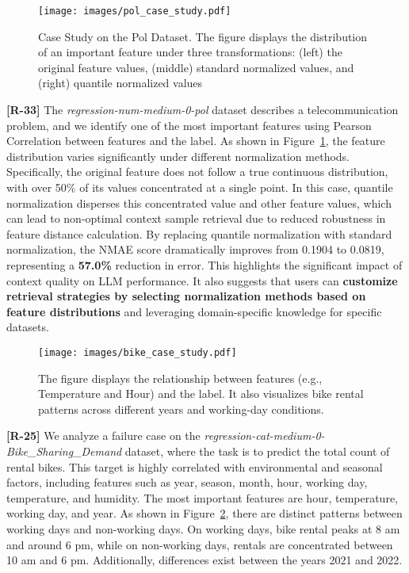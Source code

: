 \begin{figure}
    \centering
    \texttt{[image: images/pol\_case\_study.pdf]}
    \caption{Case Study on the Pol Dataset. The figure displays the distribution of an important feature under three transformations: (left) the original feature values, (middle) standard normalized values, and (right) quantile normalized values}
    \label{fig:case_pol}
\end{figure}

\textbf{[R-33]} The \textit{regression-num-medium-0-pol} dataset describes a telecommunication problem, and we identify one of the most important features using Pearson Correlation between features and the label. As shown in Figure~\ref{fig:case_pol}, the feature distribution varies significantly under different normalization methods. Specifically, the original feature does not follow a true continuous distribution, with over 50\% of its values concentrated at a single point. In this case, quantile normalization disperses this concentrated value and other feature values, which can lead to non-optimal context sample retrieval due to reduced robustness in feature distance calculation. By replacing quantile normalization with standard normalization, the NMAE score dramatically improves from 0.1904 to 0.0819, representing a \textbf{57.0\%} reduction in error. This highlights the significant impact of context quality on LLM performance. It also suggests that users can \textbf{customize retrieval strategies by selecting normalization methods based on feature distributions} and leveraging domain-specific knowledge for specific datasets.

\begin{figure}
    \centering
    \texttt{[image: images/bike\_case\_study.pdf]}
    \caption{The figure displays the relationship between features (e.g., Temperature and Hour) and the label. It also visualizes bike rental patterns across different years and working-day conditions.}
    \label{fig:case_bike}
\end{figure}


\textbf{[R-25]} We analyze a failure case on the \textit{regression-cat-medium-0-Bike\_Sharing\_Demand} dataset, where the task is to predict the total count of rental bikes. This target is highly correlated with environmental and seasonal factors, including features such as year, season, month, hour, working day, temperature, and humidity. The most important features are hour, temperature, working day, and year. As shown in Figure~\ref{fig:case_bike}, there are distinct patterns between working days and non-working days. On working days, bike rental peaks at 8 am and around 6 pm, while on non-working days, rentals are concentrated between 10 am and 6 pm. Additionally, differences exist between the years 2021 and 2022.

